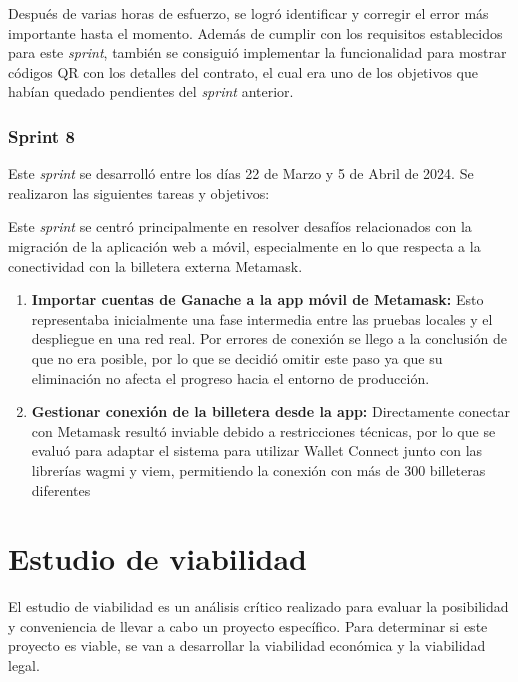 Después de varias horas de esfuerzo, se logró identificar y corregir el error más importante hasta el momento. Además de cumplir con los requisitos establecidos para este \textit{sprint}, también se consiguió implementar la funcionalidad para mostrar códigos QR con los detalles del contrato, el cual era uno de los objetivos que habían quedado pendientes del \textit{sprint} anterior. 

\subsubsection{Sprint 8}

Este \textit{sprint} se desarrolló entre los días 22 de Marzo y 5 de Abril de 2024. Se realizaron las siguientes tareas y objetivos:

Este \textit{sprint} se centró principalmente en resolver desafíos relacionados con la migración de la aplicación web a móvil, especialmente en lo que respecta a la conectividad con la billetera externa Metamask.

\begin{enumerate}

\item \textbf{Importar cuentas de Ganache a la app móvil de Metamask:} Esto representaba inicialmente una fase intermedia entre las pruebas locales y el despliegue en una red real.
Por errores de conexión se llego a la conclusión de que no era posible, por lo que se decidió omitir este paso ya que su eliminación no afecta el progreso hacia el entorno de producción.

\item \textbf{Gestionar conexión de la billetera desde la app:} Directamente conectar con Metamask resultó inviable debido a restricciones técnicas, por lo que se evaluó para adaptar el sistema para utilizar Wallet Connect junto con las librerías wagmi y viem, permitiendo la conexión con más de 300 billeteras diferentes

\end{enumerate}



\section{Estudio de viabilidad}

El estudio de viabilidad es un análisis crítico realizado para evaluar la posibilidad y conveniencia de llevar a cabo un proyecto específico.
Para determinar si este proyecto es viable, se van a desarrollar la viabilidad económica y la viabilidad legal.

